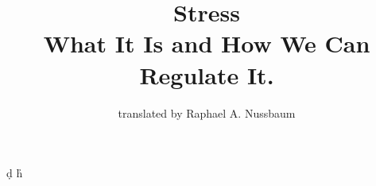 \usepackage{makeidx}

\usepackage{geometry}
\usepackage{graphicx}
\usepackage{cite}
\usepackage{blindtext}     %
\usepackage{quotchap} %
\usepackage{epigraph} %
\usepackage[etex]{adjustbox}
\usepackage{wrapfig}
\usepackage[figuresright]{rotating}
\usepackage{siunitx}
\usepackage{longtable}
\DeclareSIUnit{}
\DeclareSIUnit{}


\DeclareSIUnit{}
\DeclareSIUnit{}
\DeclareSIUnit{}
\DeclareSIUnit{}
\DeclareSIUnit{}
\DeclareSIUnit{}
\DeclareSIUnit{}
\DeclareSIUnit{}

\DeclareSIUnit{}
\DeclareSIUnit\d{d}
\DeclareSIUnit\h{h}
\DeclareSIUnit{}
\DeclareSIUnit{}

\DeclareSIUnit{}
\DeclareSIUnit{}
\DeclareSIUnit{}

\usepackage{xfrac}
\usepackage{multirow}
\usepackage{tabularx}
\usepackage{array, makecell}
\usepackage{fancybox}
\usepackage{textcomp}
\usepackage{booktabs,ltablex}
\newcommand{\tabitem}{~~\llap{\textbullet}~~}
\keepXColumns

\usepackage{mwe}
\setlength{}

\usepackage{framed, multido}
\usepackage{outlines}
\usepackage[table]{xcolor}

\newcommand{\mytextbox}[2][6]{%
\begin{framed}
\noindent#2%
\multido{\i=1+1}{#1}{\newline …}
\end{framed}}

\usepackage{gensymb}
\usepackage{pict2e}
\usepackage{minitoc}
\usepackage{enumitem}

\usepackage{lscape}

\usepackage{setspace}
\raggedbottom

\newenvironment{fminipage}%
{\begin{Sbox}\begin{minipage}}%
{\end{minipage}\end{Sbox}\fbox{\TheSbox}}

\usepackage{subfiles} %

\graphicspath{ {./images/} {./images/Stress/} {./images/Learning/} {./images/Emotions} {./images/Nutrition}} 


\makeindex
\author{translated by Raphael A. Nussbaum}
\title{Stress \\ What It Is and How We Can Regulate It.}
